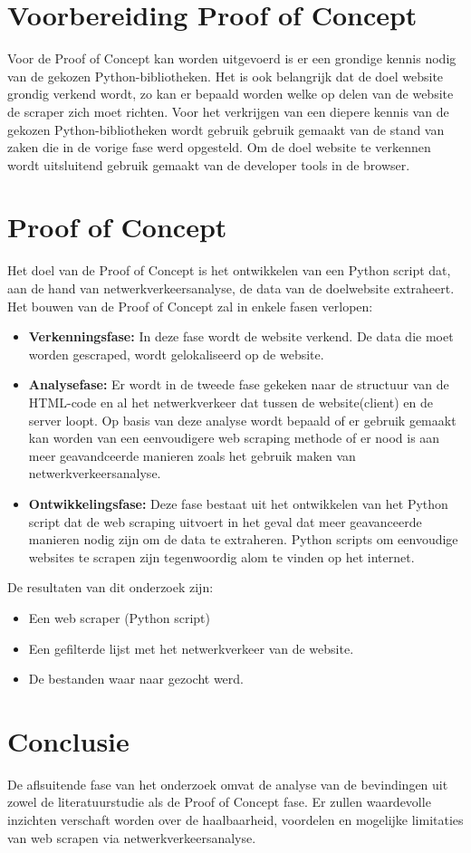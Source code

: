 \section{Voorbereiding Proof of Concept}
Voor de Proof of Concept kan worden uitgevoerd is er een grondige kennis nodig van de gekozen Python-bibliotheken. Het is ook belangrijk dat de doel website grondig verkend wordt, zo kan er bepaald worden welke op delen van de website de scraper zich moet richten. Voor het verkrijgen van een diepere kennis van de gekozen Python-bibliotheken wordt gebruik gebruik gemaakt van de stand van zaken die in de vorige fase werd opgesteld. Om de doel website te verkennen wordt uitsluitend gebruik gemaakt van de developer tools in de browser.

\section{Proof of Concept}
Het doel van de Proof of Concept is het ontwikkelen van een Python script dat, aan de hand van netwerkverkeersanalyse, de data van de doelwebsite extraheert.
Het bouwen van de Proof of Concept zal in enkele fasen verlopen:
\begin{itemize}
    \item \textbf{Verkenningsfase:} In deze fase wordt de website verkend. De data die moet worden gescraped, wordt gelokaliseerd op de website.

    \item \textbf{Analysefase:} Er wordt in de tweede fase gekeken naar de structuur van de HTML-code en al het netwerkverkeer dat tussen de website(client) en de server loopt. Op basis van deze analyse wordt bepaald of er gebruik gemaakt kan worden van een eenvoudigere web scraping methode of er nood is aan meer geavandceerde manieren zoals het gebruik maken van netwerkverkeersanalyse.

    \item \textbf{Ontwikkelingsfase:} Deze fase bestaat uit het ontwikkelen van het Python script dat de web scraping uitvoert in het geval dat meer geavanceerde manieren nodig zijn om de data te extraheren. Python scripts om eenvoudige websites te scrapen zijn tegenwoordig alom te vinden op het internet.

\end{itemize}
 De resultaten van dit onderzoek zijn:
\begin{itemize}
    \item Een web scraper (Python script)
    \item Een gefilterde lijst met het netwerkverkeer van de website.
    \item De bestanden waar naar gezocht werd.
\end{itemize}

\section{Conclusie}
De aflsuitende fase van het onderzoek omvat de analyse van de bevindingen uit zowel de literatuurstudie als de Proof of Concept fase. Er zullen waardevolle inzichten verschaft worden over de haalbaarheid, voordelen en mogelijke limitaties van web scrapen via netwerkverkeersanalyse.
